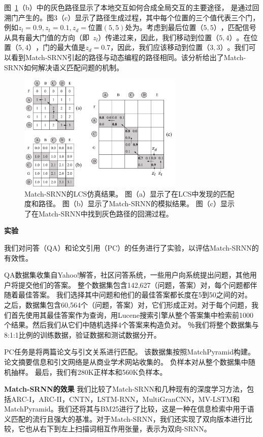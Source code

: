 图~\ref{fig:simulation}（b）中的灰色路径显示了本地交互如何合成全局交互的主要途径，
是通过回溯门产生的。图3（c）显示了路径生成过程，其中每个位置的三个值代表三个门，例如$ z_l {=} 0.9, z_t {=} 0.1, z_d {=}$位置$(5,5)$处为$ $。考虑到最后位置$（5,5）$，匹配信号从具有最大门值的方向（即~$ z_l $）传递过来，因此，我们移动到位置$（5,4）$。在位置$（5,4）$，门的最大值是$ z_d {=} 0.7 $，因此，我们应该移动到位置$（3,3）$。我们可以看到Match-SRNN引起的路径与动态编程的路径相同。该分析给出了Match-SRNN如何解决语义匹配问题的机制。
\begin{figure}[t]
\centering
\includegraphics[width=0.7\textwidth]{figures/lcs_simulation_more.pdf}
\caption{Match-SRNN的LCS仿真结果。 图（a）显示了在LCS中发现的匹配度和路径。 图（b）显示了Match-SRNN的模拟结果。 图（c）显示了在Match-SRNN中找到灰色路径的回溯过程。}\label{fig:simulation}
\end{figure}


\textbf{实验}

我们对问答（QA）和论文引用（PC）的任务进行了实验，以评估Match-SRNN的有效性。

QA数据集收集自Yahoo!解答，社区问答系统，一些用户向系统提出问题，其他用户将提交他们的答案。
整个数据集包含142,627（问题，答案）对，每个问题都伴随着最佳答案。
我们选择其中问题和他们的最佳答案都长度在5到50之间的对。
之后，数据集包含60,564个（问题，答案）对，它们形成正对。对于每个问题，我们首先使用其最佳答案作为查询，用Lucene搜索引擎从整个答案集中检索前1000个结果。然后我们从它们中随机选择4个答案来构造负对。 ％我们将整个数据集与8:1:1比例的训练数据，验证数据和测试数据分开。

PC任务是将两篇论文与引文关系进行匹配。
该数据集按照MatchPyramid构建。
论文摘要信息和引文网络是从商业学术网站​​收集的。
负样本对从整个数据集中随机抽样。
最后，我们有280K正样本和560K负样本。

\textbf{Match-SRNN的效果}
我们比较了Match-SRNN和几种现有的深度学习方法，包括ARC-I，ARC-II，CNTN，LSTM-RNN，MultiGranCNN，MV-LSTM和MatchPyramid。我们还将其与BM25进行了比较，这是一种在信息检索中用于语义匹配的流行且强大的基准。对于Match-SRNN，我们还实现了双向版本进行比较，它也从右下到左上扫描词相互作用张量，表示为双向-SRNN。

